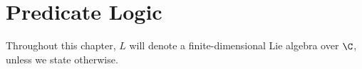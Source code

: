 \chapter{Predicate Logic}

Throughout this chapter, $L$ will denote a finite-dimensional Lie algebra over $\C$, unless we state otherwise.

